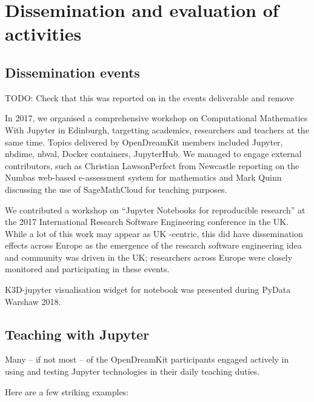 \documentclass{deliverablereport}
\author{Mike Croucher, Hans Fanghor and Nicolas M. Thiéry}
\begin{document}
\maketitle
\enlargethispage{.5cm}
\githubissuedescription
\clearpage
\tableofcontents


\section{Dissemination and evaluation of activities}

\subsection{Dissemination events}

TODO: Check that this was reported on in the events deliverable and
remove

In 2017, we organised a comprehensive workshop on Computational
Mathematics With Jupyter in Edinburgh, targetting academics, researchers
and teachers at the same time. Topics delivered by OpenDreamKit members
included Jupyter, nbdime, nbval, Docker containers, JupyterHub. We
managed to engage external contributors, such as Christian
Lawson­Perfect from Newcastle reporting on the Numbas web-based
e-assessment system for mathematics and Mark Quinn discussing the use of
SageMathCloud for teaching purposes.

We contributed a workshop on ``Jupyter Notebooks for reproducible
research'' at the 2017 International Research Software Engineering
conference in the UK. While a lot of this work may appear as UK
-centric, this did have dissemination effects across Europe as the
emergence of the research software engineering idea and community was
driven in the UK; researchers across Europe were closely monitored and
participating in these events.

K3D-jupyter visualisation widget for
\Jupyter notebook was presented during PyData Warshaw 2018.


\subsection{Teaching with Jupyter}

Many -- if not most -- of the OpenDreamKit participants engaged actively
in using and testing Jupyter technologies in their daily teaching
duties.

Here are a few striking examples:
\end{document}
